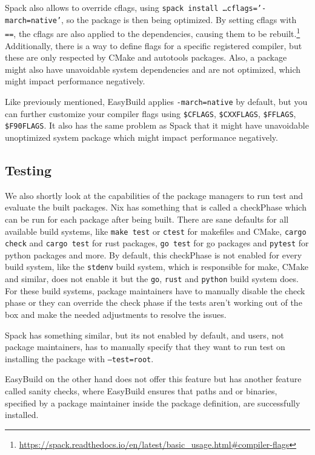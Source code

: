 \documentclass{eceasst}
\begin{document}
Spack also allows to override cflags, using \texttt{spack install \ldots cflags='-march=native'}, so the package is then being optimized.
By setting cflags with \texttt{==}, the cflags are also applied to the dependencies, causing them to be rebuilt.\footnote{\url{https://spack.readthedocs.io/en/latest/basic_usage.html\#compiler-flags}}
Additionally, there is a way to define flags for a specific registered compiler, but these are only respected by CMake and autotools packages.
Also, a package might also have unavoidable system dependencies and are not optimized, which might impact performance negatively.

Like previously mentioned, EasyBuild applies \texttt{-march=native} by default, but you can further customize your compiler flags using \texttt{\$CFLAGS}, \texttt{\$CXXFLAGS}, \texttt{\$FFLAGS}, \texttt{\$F90FLAGS}.
It also has the same problem as Spack that it might have unavoidable unoptimized system package which might impact performance negatively.\\

\subsection{Testing}

We also shortly look at the capabilities of the package managers to run test and evaluate the built packages.
Nix has something that is called a checkPhase which can be run for each package after being built.
There are sane defaults for all available build systems, like \texttt{make test} or \texttt{ctest} for makefiles and CMake, \texttt{cargo check} and \texttt{cargo test} for rust packages, \texttt{go test} for go packages and \texttt{pytest} for python packages and more.
By default, this checkPhase is not enabled for every build system, like the \texttt{stdenv} build system, which is responsible for make, CMake and similar, does not enable it but the \texttt{go}, \texttt{rust} and \texttt{python} build system does.
For these build systems, package maintainers have to manually disable the check phase or they can override the check phase if the tests aren't working out of the box and make the needed adjustments to resolve the issues.

Spack has something similar, but its not enabled by default, and users, not package maintainers, has to manually specify that they want to run test on installing the package with \texttt{--test=root}.

EasyBuild on the other hand does not offer this feature but has another feature called sanity checks, where EasyBuild ensures that paths and or binaries, specified by a package maintainer inside the package definition, are successfully installed.
\end{document}
